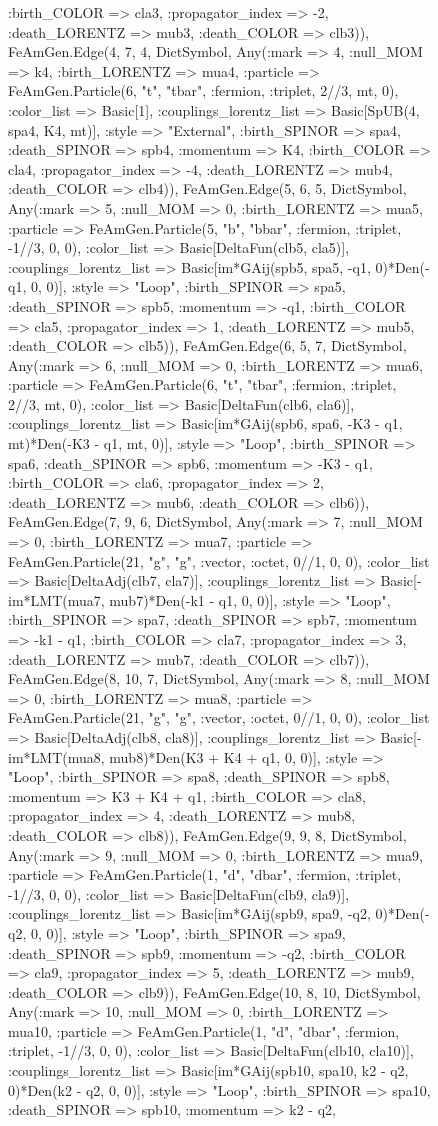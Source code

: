 \documentclass{revtex4}
\begin{document}
\begin{figure}[!htb]
\begin{center}
{:birth_COLOR => cla3, :propagator_index => -2, :death_LORENTZ => mub3, :death_COLOR => clb3)), FeAmGen.Edge(4, 7, 4, Dict{Symbol, Any}(:mark => 4, :null_MOM => k4, :birth_LORENTZ => mua4, :particle => FeAmGen.Particle(6, "t", "tbar", :fermion, :triplet, 2//3, mt, 0), :color_list => Basic[1], :couplings_lorentz_list => Basic[SpUB(4, spa4, K4, mt)], :style => "External", :birth_SPINOR => spa4, :death_SPINOR => spb4, :momentum => K4, :birth_COLOR => cla4, :propagator_index => -4, :death_LORENTZ => mub4, :death_COLOR => clb4)), FeAmGen.Edge(5, 6, 5, Dict{Symbol, Any}(:mark => 5, :null_MOM => 0, :birth_LORENTZ => mua5, :particle => FeAmGen.Particle(5, "b", "bbar", :fermion, :triplet, -1//3, 0, 0), :color_list => Basic[DeltaFun(clb5, cla5)], :couplings_lorentz_list => Basic[im*GAij(spb5, spa5, -q1, 0)*Den(-q1, 0, 0)], :style => "Loop", :birth_SPINOR => spa5, :death_SPINOR => spb5, :momentum => -q1, :birth_COLOR => cla5, :propagator_index => 1, :death_LORENTZ => mub5, :death_COLOR => clb5)), FeAmGen.Edge(6, 5, 7, Dict{Symbol, Any}(:mark => 6, :null_MOM => 0, :birth_LORENTZ => mua6, :particle => FeAmGen.Particle(6, "t", "tbar", :fermion, :triplet, 2//3, mt, 0), :color_list => Basic[DeltaFun(clb6, cla6)], :couplings_lorentz_list => Basic[im*GAij(spb6, spa6, -K3 - q1, mt)*Den(-K3 - q1, mt, 0)], :style => "Loop", :birth_SPINOR => spa6, :death_SPINOR => spb6, :momentum => -K3 - q1, :birth_COLOR => cla6, :propagator_index => 2, :death_LORENTZ => mub6, :death_COLOR => clb6)), FeAmGen.Edge(7, 9, 6, Dict{Symbol, Any}(:mark => 7, :null_MOM => 0, :birth_LORENTZ => mua7, :particle => FeAmGen.Particle(21, "g", "g", :vector, :octet, 0//1, 0, 0), :color_list => Basic[DeltaAdj(clb7, cla7)], :couplings_lorentz_list => Basic[-im*LMT(mua7, mub7)*Den(-k1 - q1, 0, 0)], :style => "Loop", :birth_SPINOR => spa7, :death_SPINOR => spb7, :momentum => -k1 - q1, :birth_COLOR => cla7, :propagator_index => 3, :death_LORENTZ => mub7, :death_COLOR => clb7)), FeAmGen.Edge(8, 10, 7, Dict{Symbol, Any}(:mark => 8, :null_MOM => 0, :birth_LORENTZ => mua8, :particle => FeAmGen.Particle(21, "g", "g", :vector, :octet, 0//1, 0, 0), :color_list => Basic[DeltaAdj(clb8, cla8)], :couplings_lorentz_list => Basic[-im*LMT(mua8, mub8)*Den(K3 + K4 + q1, 0, 0)], :style => "Loop", :birth_SPINOR => spa8, :death_SPINOR => spb8, :momentum => K3 + K4 + q1, :birth_COLOR => cla8, :propagator_index => 4, :death_LORENTZ => mub8, :death_COLOR => clb8)), FeAmGen.Edge(9, 9, 8, Dict{Symbol, Any}(:mark => 9, :null_MOM => 0, :birth_LORENTZ => mua9, :particle => FeAmGen.Particle(1, "d", "dbar", :fermion, :triplet, -1//3, 0, 0), :color_list => Basic[DeltaFun(clb9, cla9)], :couplings_lorentz_list => Basic[im*GAij(spb9, spa9, -q2, 0)*Den(-q2, 0, 0)], :style => "Loop", :birth_SPINOR => spa9, :death_SPINOR => spb9, :momentum => -q2, :birth_COLOR => cla9, :propagator_index => 5, :death_LORENTZ => mub9, :death_COLOR => clb9)), FeAmGen.Edge(10, 8, 10, Dict{Symbol, Any}(:mark => 10, :null_MOM => 0, :birth_LORENTZ => mua10, :particle => FeAmGen.Particle(1, "d", "dbar", :fermion, :triplet, -1//3, 0, 0), :color_list => Basic[DeltaFun(clb10, cla10)], :couplings_lorentz_list => Basic[im*GAij(spb10, spa10, k2 - q2, 0)*Den(k2 - q2, 0, 0)], :style => "Loop", :birth_SPINOR => spa10, :death_SPINOR => spb10, :momentum => k2 - q2, }
\end{center}
\end{figure}
\end{document}
